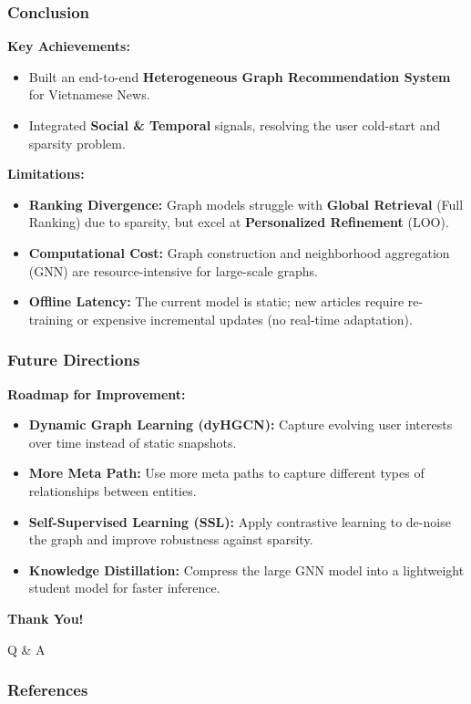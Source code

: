 \documentclass{beamer}
\begin{document}
\begin{frame}
    \frametitle{Conclusion}
    \textbf{Key Achievements:}
    \begin{itemize}
        \item Built an end-to-end \textbf{Heterogeneous Graph Recommendation System} for Vietnamese News.
        \item Integrated \textbf{Social \& Temporal} signals, resolving the user cold-start and sparsity problem.
    \end{itemize}

    \vspace{0.4cm}
    \textbf{Limitations:}
    \begin{itemize}
        \item \textbf{Ranking Divergence:} Graph models struggle with \textbf{Global Retrieval} (Full Ranking) due to sparsity, but excel at \textbf{Personalized Refinement} (LOO).
        \item \textbf{Computational Cost:} Graph construction and neighborhood aggregation (GNN) are resource-intensive for large-scale graphs.
        \item \textbf{Offline Latency:} The current model is static; new articles require re-training or expensive incremental updates (no real-time adaptation).
    \end{itemize}
\end{frame}

\begin{frame}
    \frametitle{Future Directions}
    \textbf{Roadmap for Improvement:}
    \begin{itemize}
        \item \textbf{Dynamic Graph Learning (dyHGCN):} Capture evolving user interests over time instead of static snapshots.
        \item \textbf{More Meta Path:} Use more meta paths to capture different types of relationships between entities.
        \item \textbf{Self-Supervised Learning (SSL):} Apply contrastive learning to de-noise the graph and improve robustness against sparsity.
        \item \textbf{Knowledge Distillation:} Compress the large GNN model into a lightweight student model for faster inference.
    \end{itemize}
\end{frame}

\begin{frame}
    \centering
    \Huge \textbf{Thank You!}

    \vspace{1cm}
    \large Q \& A
\end{frame}


\begin{frame}[allowframebreaks]
    \frametitle{References}
    \printbibliography
\end{frame}
\end{document}
